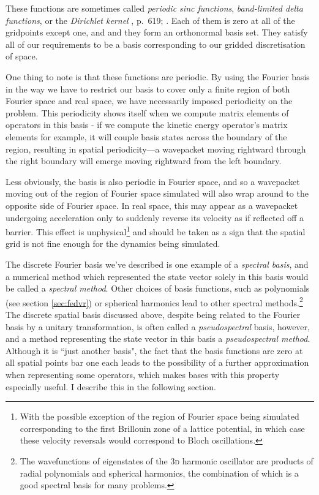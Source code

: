 These functions are sometimes called \emph{periodic sinc functions}, \emph{band-limited delta functions}, or the \emph{Dirichlet kernel}
\citeleft{}, p.~619; \citeright.
Each of them is zero at all of the gridpoints except one, and and they form an orthonormal basis set. They satisfy all of our requirements to be a basis corresponding to our gridded discretisation of space.

One thing to note is that these functions are periodic. By using the Fourier basis in the way we have to restrict our basis to cover only a finite region of both Fourier space and real space, we have necessarily imposed periodicity on the problem. This periodicity shows itself when we compute matrix elements of operators in this basis - if we compute the kinetic energy operator's matrix elements for example, it will couple basis states across the boundary of the region, resulting in spatial periodicity---a wavepacket moving rightward through the right boundary will emerge moving rightward from the left boundary.

Less obviously, the basis is also periodic in Fourier space, and so a wavepacket moving out of the region of Fourier space simulated will also wrap around to the opposite side of Fourier space. In real space, this may appear as a wavepacket undergoing acceleration only to suddenly reverse its velocity as if reflected off a barrier. This effect is unphysical\footnote{With the possible exception of the region of Fourier space being simulated corresponding to the first Brillouin zone of a lattice potential, in which case these velocity reversals would correspond to Bloch oscillations.} and should be taken as a sign that the spatial grid is not fine enough for the dynamics being simulated.

The discrete Fourier basis we've described is one example of a \emph{spectral basis}, and a numerical method which represented the state vector solely in this basis would be called a \emph{spectral method}. Other choices of basis functions, such as polynomials (see section \ref{sec:fedvr}) or spherical harmonics lead to other spectral methods.\footnote{The wavefunctions of eigenstates of the \textsc{3d} harmonic oscillator are products of radial polynomials and spherical harmonics, the combination of which is a good spectral basis for many problems.} The discrete spatial basis discussed above, despite being related to the Fourier basis by a unitary transformation, is often called a \emph{pseudospectral} basis, however, and a method representing the state vector in this basis a \emph{pseudospectral method}. Although it is ``just another basis", the fact that the basis functions are zero at all spatial points bar one each leads to the possibility of a further approximation when representing some operators, which makes bases with this property especially useful. I describe this in the following section.

